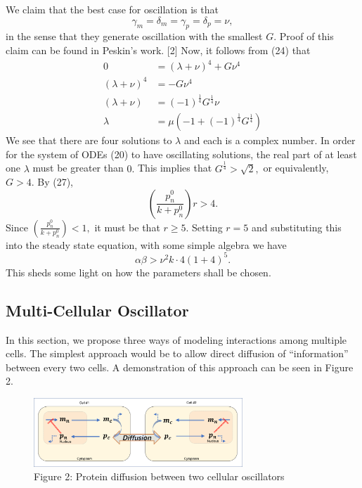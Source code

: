 \documentclass[12pt]{article}
\renewcommand{\(}{\left (}
\renewcommand{\)}{\right )}
\begin{document}
We claim that the best case for oscillation is that
\begin{equation}
    \gamma_m = \delta_m = \gamma_p = \delta_p = \nu,
\end{equation}
in the sense that they generate oscillation with the smallest $G.$ Proof of this claim can be found in Peskin's work. [2] Now, it follows from (24) that
\begin{align}
    0 &= (\lambda + \nu)^4 + G \nu ^4 \\
    (\lambda + \nu)^4 &= -G \nu ^4 \\
    (\lambda + \nu) &= (-1)^\frac{1}{4} G ^\frac{1}{4}\nu\\
    \lambda &= \mu (-1 + (-1)^\frac{1}{4} G ^\frac{1}{4})
\end{align}
We see that there are four solutions to $\lambda$ and each is a complex number. In order for the system of ODEs (20) to have oscillating solutions, the real part of at least one $\lambda$ must be greater than $0.$ This implies that $G^\frac{1}{4} > \sqrt{2},$ or equivalently, $G>4.$ By (27), \begin{equation}
    \left(\frac{p_n^0}{k+p_n^0}\right) r > 4.
\end{equation}
Since $ \left(\frac{p_n^0}{k+p_n^0}\right) < 1,$ it must be that $r\geq 5.$ Setting $r=5$ and substituting this into the steady state equation, with some simple algebra we have
\begin{equation}
    \alpha \beta > \nu^2 k \cdot 4(1+4)^5.
\end{equation}
This sheds some light on how the parameters shall be chosen.

\subsection{Multi-Cellular Oscillator}
\hspace{5mm} In this section, we propose three ways of modeling interactions among multiple cells. The simplest approach would be to allow direct diffusion of ``information'' between every two cells. A demonstration of this approach can be seen in Figure 2. \\
\begin {figure}[h]
	\centering
	\includegraphics[width=0.7\textwidth]{two_cells.png}
	\caption*{\small Figure 2: Protein diffusion between two cellular oscillators}
\end {figure}
\end{document}
